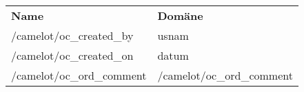 \begin{tabularx}{\textwidth}{lX}
\rowcolor{heading}\textbf{Name} & \textbf{Domäne} \\
/camelot/oc\_created\_by & usnam \\
\rowcolor{odd}/camelot/oc\_created\_on & datum \\
/camelot/oc\_ord\_comment & /camelot/oc\_ord\_comment \\
\end{tabularx}